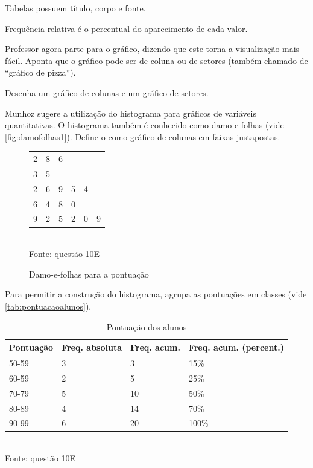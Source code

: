 \documentclass[a4paper]{article}
\begin{document}
	Tabelas possuem título, corpo e fonte.
	
	Frequência relativa é o percentual do aparecimento de cada valor.
	
	Professor agora parte para o gráfico, dizendo que este torna a visualização mais fácil. Aponta que o gráfico pode ser de coluna ou de setores (também chamado de ``gráfico de pizza'').
	
	Desenha um gráfico de colunas e um gráfico de setores.
	
	Munhoz sugere a utilização do histograma para gráficos de variáveis quantitativas. O histograma também é conhecido como damo-e-folhas (vide \autoref{fig:damofolhas1}). Define-o como gráfico de colunas em faixas justapostas.
	
	\begin{figure}[]
		\centering
		\caption{Damo-e-folhas para a pontuação}
		\begin{tabular}{l|lllll}
			2 & 8 & 6 &  &  &  \\
			3 & 5 &  &  &  &  \\
			2 & 6 & 9 & 5 & 4 &  \\
			6 & 4 & 8 & 0 &  &  \\
			9 & 2 & 5 & 2 & 0 & 9
		\end{tabular}
		\\ \vspace{1mm} Fonte: questão 10E
		\label{fig:damofolhas1}
	\end{figure}
	
	Para permitir a construção do histograma, agrupa as pontuações em classes (vide \autoref{tab:pontuacaoalunos}).
	
	\begin{table}[]
		\centering
		\caption{Pontuação dos alunos}
		\begin{tabular}{l|l|l|l}
			\textbf{Pontuação} & \textbf{Freq. absoluta} & \textbf{Freq. acum.} & \textbf{Freq. acum. (percent.)} \\ \hline
			50-59 & 3 & 3 & 15\% \\
			60-59 & 2 & 5 & 25\% \\
			70-79 & 5 & 10 & 50\% \\
			80-89 & 4 & 14 & 70\% \\
			90-99 & 6 & 20 & 100\%
		\end{tabular}
		\\ \vspace{1mm} Fonte: questão 10E
		\label{tab:pontuacaoalunos}
	\end{table}
	
\end{document}
